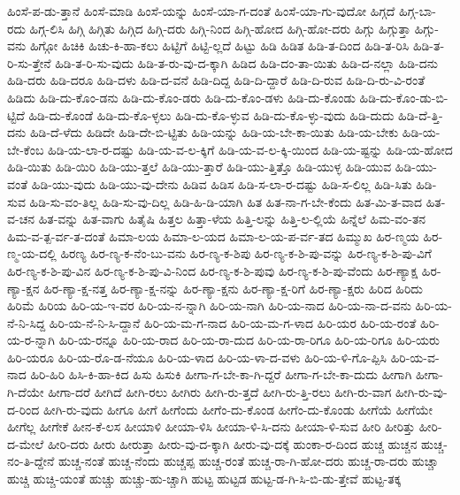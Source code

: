 {ಹಿಂಸೆ-ಪ-ಡು-ತ್ತಾನೆ
ಹಿಂಸೆ-ಮಾಡಿ
ಹಿಂಸೆ-ಯನ್ನು
ಹಿಂಸೆ-ಯಾ-ಗ-ದಂತೆ
ಹಿಂಸೆ-ಯಾ-ಗು-ವುದೋ
ಹಿಗ್ಗದೆ
ಹಿಗ್ಗ-ಬಾ-ರದು
ಹಿಗ್ಗ-ಲಿಸಿ
ಹಿಗ್ಗಿ
ಹಿಗ್ಗಿತು
ಹಿಗ್ಗಿದ
ಹಿಗ್ಗಿ-ದರು
ಹಿಗ್ಗಿ-ನಿಂದ
ಹಿಗ್ಗಿ-ಹೋದ
ಹಿಗ್ಗಿ-ಹೋ-ದರು
ಹಿಗ್ಗು
ಹಿಗ್ಗುತ್ತಾ
ಹಿಗ್ಗು-ವನು
ಹಿಗ್ಗೋ
ಹಿಚಿಕಿ
ಹಿಚು-ಕಿ-ಹಾ-ಕಲು
ಹಿಟ್ಟಿಗೆ
ಹಿಟ್ಟಿ-ಲ್ಲದೆ
ಹಿಟ್ಟು
ಹಿಡಿ
ಹಿಡಿತ
ಹಿಡಿ-ತ-ದಿಂದ
ಹಿಡಿ-ತ-ರಿಸಿ
ಹಿಡಿ-ತ-ರಿ-ಸು-ತ್ತೇನೆ
ಹಿಡಿ-ತ-ರಿ-ಸು-ವುದು
ಹಿಡಿ-ತ-ರು-ವು-ದ-ಕ್ಕಾಗಿ
ಹಿಡಿದ
ಹಿಡಿ-ದಂ-ತಾ-ಯಿತು
ಹಿಡಿ-ದ-ನಲ್ಲಾ
ಹಿಡಿ-ದನು
ಹಿಡಿ-ದರು
ಹಿಡಿ-ದರೂ
ಹಿಡಿ-ದಳು
ಹಿಡಿ-ದ-ವನೆ
ಹಿಡಿ-ದಿದ್ದ
ಹಿಡಿ-ದಿ-ದ್ದಾರೆ
ಹಿಡಿ-ದಿ-ರುವ
ಹಿಡಿ-ದಿ-ರು-ವಿ-ರಂತೆ
ಹಿಡಿದು
ಹಿಡಿ-ದು-ಕೊಂ-ಡನು
ಹಿಡಿ-ದು-ಕೊಂ-ಡರು
ಹಿಡಿ-ದು-ಕೊಂ-ಡಳು
ಹಿಡಿ-ದು-ಕೊಂಡು
ಹಿಡಿ-ದು-ಕೊಂ-ಡು-ಬಿ-ಟ್ಟಿದೆ
ಹಿಡಿ-ದು-ಕೊಂಡೆ
ಹಿಡಿ-ದು-ಕೊ-ಳ್ಳಲು
ಹಿಡಿ-ದು-ಕೊ-ಳ್ಳುವ
ಹಿಡಿ-ದು-ಕೊ-ಳ್ಳು-ವುದು
ಹಿಡಿ-ದುದು
ಹಿಡಿ-ದೆ-ತ್ತಿ-ದನು
ಹಿಡಿ-ದೆ-ಳೆದು
ಹಿಡಿದೇ
ಹಿಡಿ-ದೇ-ಬಿ-ಟ್ಟಿತು
ಹಿಡಿ-ಯನ್ನು
ಹಿಡಿ-ಯ-ಬೇ-ಕಾ-ಯಿತು
ಹಿಡಿ-ಯ-ಬೇಕು
ಹಿಡಿ-ಯ-ಬೇ-ಕೆಂಬ
ಹಿಡಿ-ಯ-ಲಾ-ರ-ದಷ್ಟು
ಹಿಡಿ-ಯ-ವ-ಲ-ಕ್ಕಿಗೆ
ಹಿಡಿ-ಯ-ವ-ಲ-ಕ್ಕಿ-ಯಿಂದ
ಹಿಡಿ-ಯ-ಷ್ಟನ್ನು
ಹಿಡಿ-ಯ-ಹೋದ
ಹಿಡಿ-ಯಿತು
ಹಿಡಿ-ಯಿರಿ
ಹಿಡಿ-ಯು-ತ್ತಲೆ
ಹಿಡಿ-ಯು-ತ್ತಾರೆ
ಹಿಡಿ-ಯು-ತ್ತಿತ್ತೊ
ಹಿಡಿ-ಯುಳ್ಳ
ಹಿಡಿ-ಯುವ
ಹಿಡಿ-ಯು-ವಂತೆ
ಹಿಡಿ-ಯು-ವುದು
ಹಿಡಿ-ಯು-ವು-ದೇನು
ಹಿಡಿವ
ಹಿಡಿಸ
ಹಿಡಿ-ಸ-ಲಾ-ರ-ದಷ್ಟು
ಹಿಡಿ-ಸ-ಲಿಲ್ಲ
ಹಿಡಿ-ಸಿತು
ಹಿಡಿ-ಸುವ
ಹಿಡಿ-ಸು-ವಂ-ತಿಲ್ಲ
ಹಿಡಿ-ಸು-ವು-ದಿಲ್ಲ
ಹಿಡಿ-ಹಿ-ಡಿ-ಯಾಗಿ
ಹಿತ
ಹಿತ-ನಾ-ಗ-ಬೇ-ಕೆಂದು
ಹಿತ-ಮಿ-ತ-ವಾದ
ಹಿತ-ವ-ಚನ
ಹಿತ-ವನ್ನು
ಹಿತ-ವಾಗು
ಹಿತೈಷಿ
ಹಿತ್ತಲ
ಹಿತ್ತಾ-ಳೆಯ
ಹಿತ್ತಿ-ಲನ್ನು
ಹಿತ್ತಿ-ಲ-ಲ್ಲಿಯೆ
ಹಿನ್ನೆಲೆ
ಹಿಮ-ವಂ-ತನ
ಹಿಮ-ವ-ತ್ಪ-ರ್ವ-ತ-ದಂತೆ
ಹಿಮಾ-ಲಯ
ಹಿಮಾ-ಲ-ಯದ
ಹಿಮಾ-ಲ-ಯ-ಪ-ರ್ವ-ತದ
ಹಿಮ್ಮುಖ
ಹಿರ-ಣ್ಮಯ
ಹಿರ-ಣ್ಮ-ಯ-ದಲ್ಲಿ
ಹಿರಣ್ಯ
ಹಿರ-ಣ್ಯ-ಕ-ನೆಂ-ಬು-ವನು
ಹಿರ-ಣ್ಯ-ಕ-ಶಿಪು
ಹಿರ-ಣ್ಯ-ಕ-ಶಿ-ಪು-ವನ್ನು
ಹಿರ-ಣ್ಯ-ಕ-ಶಿ-ಪು-ವಿಗೆ
ಹಿರ-ಣ್ಯ-ಕ-ಶಿ-ಪು-ವಿನ
ಹಿರ-ಣ್ಯ-ಕ-ಶಿ-ಪು-ವಿ-ನಿಂದ
ಹಿರ-ಣ್ಯ-ಕ-ಶಿ-ಪುವು
ಹಿರ-ಣ್ಯ-ಕ-ಶಿ-ಪು-ವೆಂದು
ಹಿರ-ಣ್ಯಾಕ್ಷ
ಹಿರ-ಣ್ಯಾ-ಕ್ಷನ
ಹಿರ-ಣ್ಯಾ-ಕ್ಷ-ನತ್ತ
ಹಿರ-ಣ್ಯಾ-ಕ್ಷ-ನನ್ನು
ಹಿರ-ಣ್ಯಾ-ಕ್ಷನು
ಹಿರ-ಣ್ಯಾ-ಕ್ಷ-ರಿಗೆ
ಹಿರ-ಣ್ಯಾ-ಕ್ಷರು
ಹಿರಿದ
ಹಿರಿದು
ಹಿರಿಮೆ
ಹಿರಿಯ
ಹಿರಿ-ಯ-ಇ-ವರ
ಹಿರಿ-ಯ-ನ-ನ್ನಾಗಿ
ಹಿರಿ-ಯ-ನಾಗಿ
ಹಿರಿ-ಯ-ನಾದ
ಹಿರಿ-ಯ-ನಾ-ದ-ವನು
ಹಿರಿ-ಯ-ನೆ-ನಿ-ಸಿದ್ದ
ಹಿರಿ-ಯ-ನೆ-ನಿ-ಸಿ-ದ್ದಾನೆ
ಹಿರಿ-ಯ-ಮ-ಗ-ನಾದ
ಹಿರಿ-ಯ-ಮ-ಗ-ಳಾದ
ಹಿರಿ-ಯರ
ಹಿರಿ-ಯ-ರಂತೆ
ಹಿರಿ-ಯ-ರ-ನ್ನಾಗಿ
ಹಿರಿ-ಯ-ರನ್ನೂ
ಹಿರಿ-ಯ-ರಾದ
ಹಿರಿ-ಯ-ರಾ-ದುದ
ಹಿರಿ-ಯ-ರಾ-ರಿಗೂ
ಹಿರಿ-ಯ-ರಿಗೂ
ಹಿರಿ-ಯರು
ಹಿರಿ-ಯರೂ
ಹಿರಿ-ಯ-ರೊ-ಡ-ನೆಯೂ
ಹಿರಿ-ಯ-ಳಾದ
ಹಿರಿ-ಯ-ಳಾ-ದ-ವಳು
ಹಿರಿ-ಯ-ಳಿ-ಗೊ-ಪ್ಪಿಸಿ
ಹಿರಿ-ಯ-ವ-ನಾದ
ಹಿರಿ-ಹಿರಿ
ಹಿಸಿ-ಕಿ-ಹಾ-ಕಿದ
ಹಿಸು
ಹಿಸುಕಿ
ಹೀಗಾ-ಗ-ಬೇ-ಕಾ-ಗಿ-ದ್ದರೆ
ಹೀಗಾ-ಗ-ಬೇ-ಕಾ-ದುದು
ಹೀಗಾಗಿ
ಹೀಗಾ-ಗಿ-ದೆಯೇ
ಹೀಗಾ-ದರೆ
ಹೀಗಿದೆ
ಹೀಗಿ-ರಲು
ಹೀಗಿರು
ಹೀಗಿ-ರು-ತ್ತದೆ
ಹೀಗಿ-ರು-ತ್ತಿ-ರಲು
ಹೀಗಿ-ರು-ವಾಗ
ಹೀಗಿ-ರು-ವು-ದ-ರಿಂದ
ಹೀಗಿ-ರು-ವುದು
ಹೀಗೂ
ಹೀಗೆ
ಹೀಗೆಂದು
ಹೀಗೆಂ-ದು-ಕೊಂಡ
ಹೀಗೆಂ-ದು-ಕೊಂಡು
ಹೀಗೆಯೆ
ಹೀಗೆಯೇ
ಹೀಗೆಲ್ಲ
ಹೀಗೇಕೆ
ಹೀನ-ಕೆ-ಲಸ
ಹೀಯಾಳಿ
ಹೀಯಾ-ಳಿಸಿ
ಹೀಯಾ-ಳಿ-ಸಿ-ದನು
ಹೀಯಾ-ಳಿ-ಸುವ
ಹೀರಿ
ಹೀರಿತ್ತು
ಹೀರಿ-ದ-ಮೇಲೆ
ಹೀರಿ-ದರು
ಹೀರು
ಹೀರುತ್ತಾ
ಹೀರು-ವು-ದ-ಕ್ಕಾಗಿ
ಹೀರು-ವು-ದಕ್ಕೆ
ಹುಂಕಾ-ರ-ದಿಂದ
ಹುಚ್ಚ
ಹುಚ್ಚನ
ಹುಚ್ಚ-ನಂ-ತಿ-ದ್ದೇನೆ
ಹುಚ್ಚ-ನಂತೆ
ಹುಚ್ಚ-ನೆಂದು
ಹುಚ್ಚಪ್ಪ
ಹುಚ್ಚ-ರಂತೆ
ಹುಚ್ಚ-ರಾ-ಗಿ-ಹೋ-ದರು
ಹುಚ್ಚ-ರಾ-ದರು
ಹುಚ್ಚಾ
ಹುಚ್ಚಿ
ಹುಚ್ಚಿ-ಯಂತೆ
ಹುಚ್ಚು
ಹುಚ್ಚು-ಹು-ಚ್ಚಾಗಿ
ಹುಟ್ಟ
ಹುಟ್ಟಡ
ಹುಟ್ಟ-ಡ-ಗಿ-ಸಿ-ಬಿ-ಡು-ತ್ತೇವೆ
ಹುಟ್ಟ-ತಕ್ಕ
}
